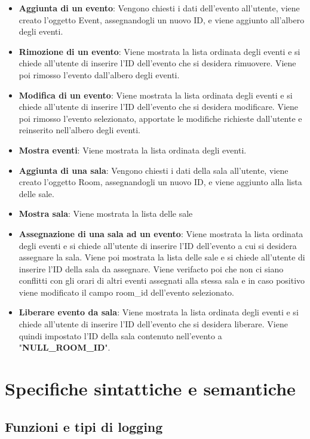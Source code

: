\documentclass[11pt]{scrartcl} %
\begin{document}
\begin{itemize}
    \item \textbf{Aggiunta di un evento}: Vengono chiesti i dati dell'evento all'utente, viene creato l'oggetto Event, assegnandogli un nuovo ID, e viene aggiunto all'albero degli eventi.
    \item \textbf{Rimozione di un evento}: Viene mostrata la lista ordinata degli eventi e si chiede all'utente di inserire l'ID dell'evento che si desidera rimuovere. Viene poi rimosso l'evento dall'albero degli eventi.
    \item \textbf{Modifica di un evento}: Viene mostrata la lista ordinata degli eventi e si chiede all'utente di inserire l'ID dell'evento che si desidera modificare. Viene poi rimosso l'evento selezionato, apportate le modifiche richieste dall'utente e reinserito nell'albero degli eventi.
    \item \textbf{Mostra eventi}: Viene mostrata la lista ordinata degli eventi.
    \item \textbf{Aggiunta di una sala}: Vengono chiesti i dati della sala all'utente, viene creato l'oggetto Room, assegnandogli un nuovo ID, e viene aggiunto alla lista delle sale.
    \item \textbf{Mostra sala}: Viene mostrata la lista delle sale
    \item \textbf{Assegnazione di una sala ad un evento}: Viene mostrata la lista ordinata degli eventi e si chiede all'utente di inserire l'ID dell'evento a cui si desidera assegnare la sala. Viene poi mostrata la lista delle sale e si chiede all'utente di inserire l'ID della sala da assegnare. Viene verifacto poi che non ci siano conflitti con gli orari di altri eventi assegnati alla stessa sala e in caso positivo viene modificato il campo room\_id dell'evento selezionato.
    \item \textbf{Liberare evento da sala}: Viene mostrata la lista ordinata degli eventi e si chiede all'utente di inserire l'ID dell'evento che si desidera liberare. Viene quindi impostato l'ID della sala contenuto nell'evento a "\textbf{NULL\_ROOM\_ID}".

\end{itemize}


\section{Specifiche sintattiche e semantiche}

\subsection{Funzioni e tipi di logging}
\end{document}
